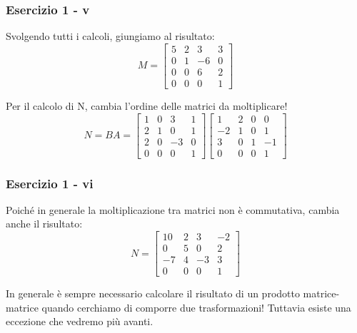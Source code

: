 \documentclass{beamer}
\begin{document}
\begin{frame}
\frametitle{Esercizio 1 - v}
Svolgendo tutti i calcoli, giungiamo al risultato:
\begin{displaymath}
    M =
\begin{bmatrix}
   5 &  2 &  3 &  3 \\
   0 &  1 & -6 &  0 \\
   0 &  0 &  6 &  2 \\
   0 &  0 &  0 &  1
\end{bmatrix}
\end{displaymath}

Per il calcolo di N, cambia l'ordine delle matrici da moltiplicare!
\begin{displaymath}
    N = B A =
\begin{bmatrix}
   1 &  0 &  3 &  1 \\
   2 &  1 &  0 &  1 \\
   2 &  0 & -3 &  0 \\
   0 &  0 &  0 &  1 
\end{bmatrix}
\begin{bmatrix}
   1 &  2 &  0 &  0 \\
  -2 &  1 &  0 &  1 \\
   3 &  0 &  1 & -1 \\
   0 &  0 &  0 &  1
\end{bmatrix}
\end{displaymath}

\end{frame}
%
\begin{frame}
\frametitle{Esercizio 1 - vi}
Poich\'e in generale la moltiplicazione tra matrici non \`e commutativa, cambia anche il risultato:
\begin{displaymath}
    N =
\begin{bmatrix}
  10 &  2 &  3 & -2 \\
   0 &  5 &  0 &  2 \\
  -7 &  4 & -3 &  3 \\
   0 &  0 &  0 &  1
\end{bmatrix}
\end{displaymath}

In generale \`e sempre necessario calcolare il risultato di un prodotto matrice-matrice
quando cerchiamo di comporre due trasformazioni! Tuttavia esiste una eccezione che vedremo pi\`u avanti.

\end{frame}
%
\end{document}
